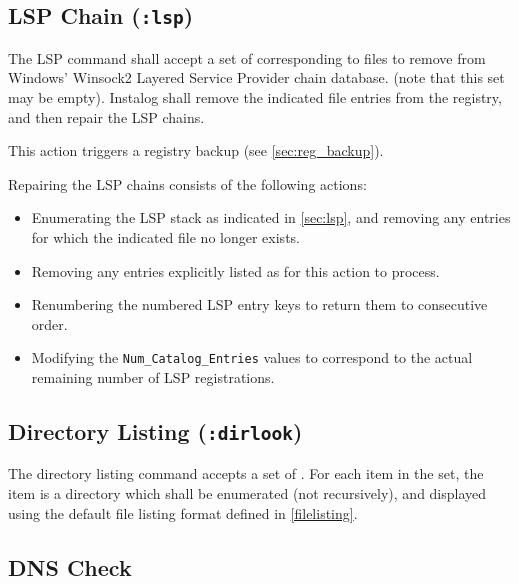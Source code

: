 \subsection{LSP Chain (\texttt{:lsp})}
The LSP command shall accept a set of  corresponding to files to
remove from Windows' Winsock2 Layered Service Provider chain database. (note
that this set may be empty). Instalog shall remove the indicated file entries
from the registry, and then repair the LSP chains.

This action triggers a registry backup (see \ref{sec:reg_backup}).

Repairing the LSP chains consists of the following actions:
\begin{itemize}
    \item Enumerating the LSP stack as indicated in \ref{sec:lsp}, and removing
    any entries for which the indicated file no longer exists.
    \item Removing any entries explicitly listed as  for this action
    to process.
    \item Renumbering the numbered LSP entry keys to return them to consecutive
    order.
    \item Modifying the \verb|Num_Catalog_Entries| values to correspond to the
    actual remaining number of LSP registrations.
\end{itemize}

\subsection{Directory Listing (\texttt{:dirlook})}
The directory listing command accepts a set of . For each item in the
set, the item is a directory which shall be enumerated (not recursively), and
displayed using the default file listing format defined in \ref{filelisting}.

\subsection{DNS Check}
